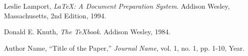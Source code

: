 \begin{thebibliography}{9}

  Leslie Lamport,
  \textit{\LaTeX: A Document Preparation System}.
  Addison Wesley, Massachusetts,
  2nd Edition,
  1994.

  Donald E. Knuth,
  \textit{The \TeX book}.
  Addison Wesley, 1984.

  Author Name,
  ``Title of the Paper,''
  \textit{Journal Name},
  vol. 1, no. 1, pp. 1-10, Year.

\end{thebibliography}